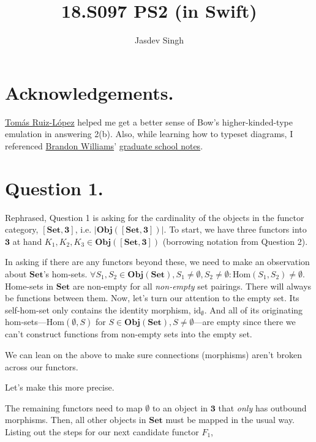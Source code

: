 \documentclass{article}
\title{18.S097 PS2 (in Swift)}
\author{Jasdev Singh}
\begin{document}
\maketitle

\section*{Acknowledgements.}

\href{https://twitter.com/tomasruizlopez}{Tomás Ruiz-López} helped me get a better sense of Bow’s higher-kinded-type emulation in answering 2(b). Also, while learning how to typeset diagrams, I referenced \href{https://twitter.com/mbrandonw}{Brandon Williams}’ \href{https://github.com/mbrandonw/my-math-notes}{graduate school notes}.

\section*{Question 1.}

Rephrased, Question 1 is asking for the cardinality of the objects in the functor category, $[\textbf{Set}, \textbf{3}]$, i.e. $|\textbf{Obj}([\textbf{Set}, \textbf{3}])|$. To start, we have three functors into $\textbf{3}$ at hand $K_1, K_2, K_3 \in \textbf{Obj}([\textbf{Set}, \textbf{3}])$ (borrowing notation from Question 2).

In asking if there are any functors beyond these, we need to make an observation about $\textbf{Set}$’s hom-sets. $\forall S_1, S_2 \in \textbf{Obj}(\textbf{Set}), S_1 \neq \emptyset, S_2 \neq \emptyset: \textrm{Hom}(S_1, S_2) \neq \emptyset$. Home-sets in $\textbf{Set}$ are non-empty for all \textit{non-empty} set pairings. There will always be functions between them.
Now, let's turn our attention to the empty set. Its self-hom-set only contains the identity morphism, $\textrm{id}_{\emptyset}$. And all of its originating hom-sets—$\textrm{Hom}(\emptyset, S)$ for $S \in \textbf{Obj}(\textbf{Set}), S \neq \emptyset$—are empty since there we can’t construct functions from non-empty sets into the empty set.

We can lean on the above to make sure connections (morphisms) aren’t broken across our functors.

Let’s make this more precise.

The remaining functors need to map $\emptyset$ to an object in $\textbf{3}$ that \textit{only} has outbound morphisms. Then, all other objects in $\textbf{Set}$ must be mapped in the usual way. Listing out the steps for our next candidate functor $F_1$,
\end{document}
